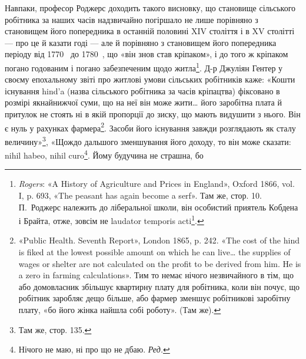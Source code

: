 Навпаки, професор Роджерс доходить такого висновку, що
становище сільського робітника за наших часів надзвичайно
погіршало не лише порівняно з становищем його попередника
в останній половині XIV століття і в XV столітті — про це й
казати годі — але й порівняно з становищем його попередника
періоду від 1770~ до 1780~, що «він знов став кріпаком», і
до того ж кріпаком погано годованим і погано забезпеченим щодо
житла\footnote{
\emph{Rogers}: «A History of Agriculture and Prices in England», Oxford
1866, vol. I, p. 693, «The peasant has again become a serf». Там же, стор. 10.
П.~Роджерс належить до ліберальної школи, він особистий приятель
Кобдена і Брайта, отже, зовсім не laudator temporis acti\footnote*{
хвалій минулих часів. \emph{Ред.}
}.
}. Д-р Джуліян Гентер у своєму епохальному звіті про
житлові умови сільських робітників каже: «Кошти існування
hind’a (назва сільського робітника за часів кріпацтва) фіксовано
в розмірі якнайнижчої суми, що на неї він може жити\dots{} його
заробітна плата й притулок не стоять ні в якій пропорції до зиску,
що мають видушити з нього. Він є нуль у рахунках фармера\footnote{
«Public Health. Seventh Report», London 1865, p. 242. «The cost of
the hind is fiked at the lowest possible amount on which he can live\dots{} the
supplies of wages or shelter are not calculated on the profit to be derived
from him. He is a zero in farming calculations». Тим то немає нічого незвичайного
в тім, що або домовласник збільшує квартирну плату для робітника,
коли він почує, що робітник заробляє дещо більше, або фармер
зменшує робітникові заробітну плату, «бо його жінка найшла собі
роботу». (Там же).
}.
Засоби його існування завжди розглядають як сталу величину»\footnote{
Там же, стор. 135.
},
«Щождо дальшого зменшування його доходу, то він може сказати:
nihil habeo, nihil curo\footnote*{
Нічого не маю, ні про що не дбаю. \emph{Ред.}
}. Йому будучина не страшна, бо
\parbreak{}  %
